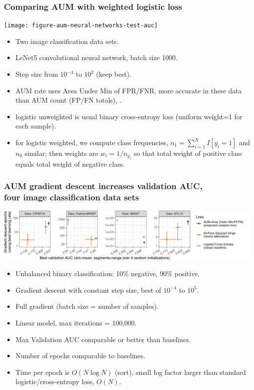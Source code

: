 \documentclass[t]{beamer}
\begin{document}
\begin{frame}
  \frametitle{Comparing AUM with weighted logistic loss}
  \texttt{[image: figure-aum-neural-networks-test-auc]}
  \begin{itemize}
  \item Two image classification data sets.
  \item LeNet5 convolutional neural network, batch size 1000.
  \item Step size from $10^{-4}$ to $10^2$ (keep best).
  \item AUM rate uses Area Under Min of FPR/FNR, more accurate in
    these data than AUM count (FP/FN totals), .
  \item logistic unweighted is usual binary cross-entropy loss (uniform weight=1 for each sample). 
  \item for logistic weighted, we compute class frequencies, $n_1=\sum_{i=1}^N I[y_i=1]$ and $n_0$ similar; then weights are $w_i=1/n_{y_i}$ so that total weight of positive class equals total weight of negative class.
  \end{itemize}
\end{frame}
 
\begin{frame}
  \frametitle{AUM gradient descent increases validation AUC,\\
    four image classification data sets}
 
\includegraphics[width=\textwidth]{data_Classif_batchtools_best_valid_scatter}

\begin{itemize}
\item Unbalanced binary classification: 10\% negative, 90\% positive.
\item Gradient descent with constant step size, best of $10^{-4}$ to $10^5$.
\item Full gradient (batch size = number of samples).
\item Linear model, max iterations = 100,000.
\item Max Validation AUC comparable or better than baselines.
\item Number of epochs comparable to baselines.
\item Time per epoch is $O(N \log N)$ (sort), small log factor larger than standard logistic/cross-entropy loss, $O(N)$.
\end{itemize}

\end{frame}
\end{document}
